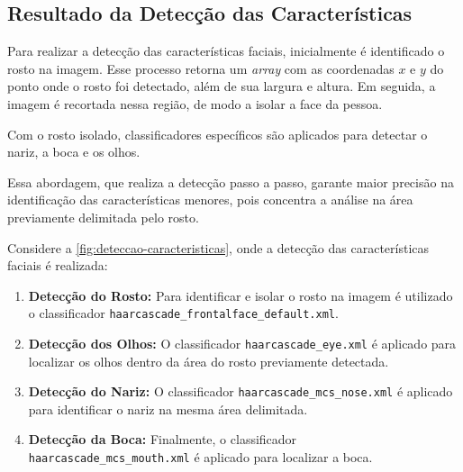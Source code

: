 
\subsection{Resultado da Detecção das Características}

Para realizar a detecção das características faciais, inicialmente é identificado o rosto na imagem. Esse processo retorna um \textit{array} com as coordenadas $x$ e $y$ do ponto onde o rosto foi detectado, além de sua largura e altura. Em seguida, a imagem é recortada nessa região, de modo a isolar a face da pessoa.

Com o rosto isolado, classificadores específicos são aplicados para detectar o nariz, a boca e os olhos.

Essa abordagem, que realiza a detecção passo a passo, garante maior precisão na identificação das características menores, pois concentra a análise na área previamente delimitada pelo rosto.

Considere a \autoref{fig:deteccao-caracteristicas}, onde a detecção das características faciais é realizada:
\begin{enumerate}
    \item \textbf{Detecção do Rosto:} Para identificar e isolar o rosto na imagem é utilizado o classificador \texttt{haarcascade\_frontalface\_default.xml}.
    \item \textbf{Detecção dos Olhos:} O classificador \texttt{haarcascade\_eye.xml} é aplicado para localizar os olhos dentro da área do rosto previamente detectada.
    \item \textbf{Detecção do Nariz:} O classificador \texttt{haarcascade\_mcs\_nose.xml} é aplicado para identificar o nariz na mesma área delimitada.
    \item \textbf{Detecção da Boca:} Finalmente, o classificador \\
    \texttt{haarcascade\_mcs\_mouth.xml} é aplicado para localizar a boca.
\end{enumerate}

